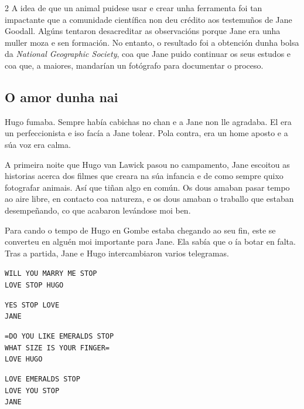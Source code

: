 \begin{multicols}{2}
A idea de que un animal puidese usar e crear unha ferramenta foi tan
impactante que a comunidade científica non deu crédito aos testemuños de Jane
Goodall. Algúns tentaron desacreditar as observacións porque Jane era unha
muller moza e sen formación. No entanto, o resultado foi a obtención dunha
bolsa da \textit{National Geographic Society}, coa que Jane puido continuar os
seus estudos e coa que, a maiores, mandarían un fotógrafo para documentar o
proceso.

\subsection*{O amor dunha nai}

Hugo fumaba. Sempre había cabichas no chan e a Jane non lle agradaba. El era un
perfeccionista e iso facía a Jane tolear. Pola contra, era un home aposto e a
súa voz era calma.

A primeira noite que Hugo van Lawick pasou no campamento, Jane escoitou as
historias acerca dos filmes que creara na súa infancia e de como sempre quixo
fotografar animais. Así que tiñan algo en común. Os dous amaban pasar tempo ao
aire libre, en contacto coa natureza, e os dous amaban o traballo que estaban
desempeñando, co que acabaron levándose moi ben.

Para cando o tempo de Hugo en Gombe estaba chegando ao seu fin, este se
converteu en alguén moi importante para Jane. Ela sabía que o ía botar en
falta. Tras a partida, Jane e Hugo intercambiaron varios telegramas.

\begin{center}
    \begin{minipage}{1\linewidth}
        \raggedright
        \texttt{WILL YOU MARRY ME STOP\\ LOVE STOP HUGO}
    \end{minipage}
    \begin{minipage}{1\linewidth}
        \raggedleft
        \texttt{YES STOP LOVE\\ JANE}
    \end{minipage}
    \begin{minipage}{1\linewidth}
        \raggedright
        \texttt{=DO YOU LIKE EMERALDS STOP\\ WHAT SIZE IS YOUR FINGER=\\ LOVE HUGO}
    \end{minipage}
    \begin{minipage}{1\linewidth}
        \raggedleft
        \texttt{LOVE EMERALDS STOP\\ LOVE YOU STOP\\ JANE}
    \end{minipage}
\end{center}


\end{multicols}
